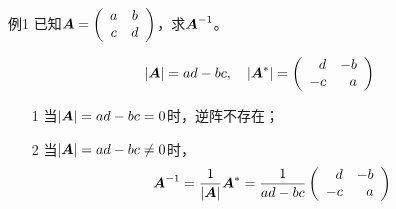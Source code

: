 \begin{frame}
  \begin{footnotesize}
    \begin{exampleblock}{例1}
      已知$\boldsymbol{A} = \left(
      \begin{array}{cc}
        a & b \\
        c & d
      \end{array}
      \right)$，求$\boldsymbol{A}^{-1}$。
    \end{exampleblock}
    \pause 
    \jiename
    $$
    |\boldsymbol{A}| = ad-bc, \quad
    |\boldsymbol{A}^*| = \left(
    \begin{array}{rr}
      d & -b \\
      -c & a
    \end{array}
    \right)
    $$
    \pause 
    \begin{itemize}
    \item[1] 当$|\boldsymbol{A}|=ad-bc=0$时，逆阵不存在；\pause 
    \item[2] 当$|\boldsymbol{A}|=ad-bc\ne0$时，
      $$
      \boldsymbol{A}^{-1} = \frac1{|\boldsymbol{A}|} \boldsymbol{A}^* = \frac1{ad-bc}\left(
      \begin{array}{rr}
        d & -b \\
        -c & a
      \end{array}
      \right)
      $$
    \end{itemize}
    
  \end{footnotesize}
\end{frame}
 


